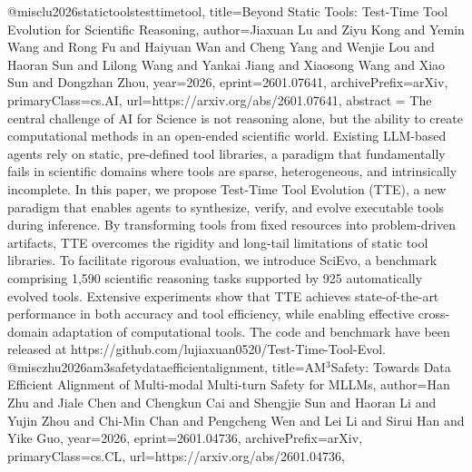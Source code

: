 {}@misc{lu2026statictoolstesttimetool,
      title={Beyond Static Tools: Test-Time Tool Evolution for Scientific Reasoning}, 
      author={Jiaxuan Lu and Ziyu Kong and Yemin Wang and Rong Fu and Haiyuan Wan and Cheng Yang and Wenjie Lou and Haoran Sun and Lilong Wang and Yankai Jiang and Xiaosong Wang and Xiao Sun and Dongzhan Zhou},
      year={2026},
      eprint={2601.07641},
      archivePrefix={arXiv},
      primaryClass={cs.AI},
      url={https://arxiv.org/abs/2601.07641},
      abstract = {The central challenge of AI for Science is not reasoning alone, but the ability to create computational methods in an open-ended scientific world. Existing LLM-based agents rely on static, pre-defined tool libraries, a paradigm that fundamentally fails in scientific domains where tools are sparse, heterogeneous, and intrinsically incomplete. In this paper, we propose Test-Time Tool Evolution (TTE), a new paradigm that enables agents to synthesize, verify, and evolve executable tools during inference. By transforming tools from fixed resources into problem-driven artifacts, TTE overcomes the rigidity and long-tail limitations of static tool libraries. To facilitate rigorous evaluation, we introduce SciEvo, a benchmark comprising 1,590 scientific reasoning tasks supported by 925 automatically evolved tools. Extensive experiments show that TTE achieves state-of-the-art performance in both accuracy and tool efficiency, while enabling effective cross-domain adaptation of computational tools. The code and benchmark have been released at https://github.com/lujiaxuan0520/Test-Time-Tool-Evol.}
}@misc{zhu2026am3safetydataefficientalignment,
      title={AM$^3$Safety: Towards Data Efficient Alignment of Multi-modal Multi-turn Safety for MLLMs}, 
      author={Han Zhu and Jiale Chen and Chengkun Cai and Shengjie Sun and Haoran Li and Yujin Zhou and Chi-Min Chan and Pengcheng Wen and Lei Li and Sirui Han and Yike Guo},
      year={2026},
      eprint={2601.04736},
      archivePrefix={arXiv},
      primaryClass={cs.CL},
      url={https://arxiv.org/abs/2601.04736},
}
